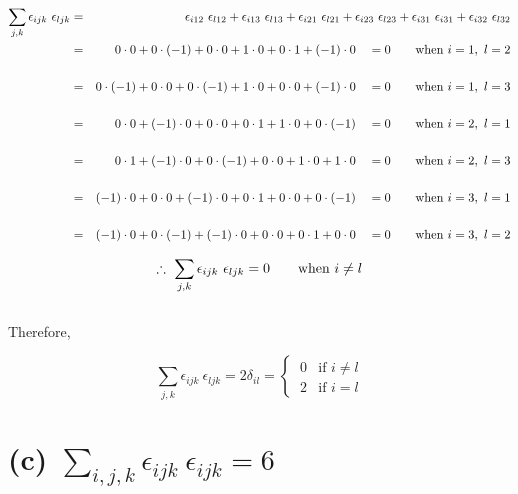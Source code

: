 \documentclass[a4paper]{article}
\begin{document}
\begin{eqnarray*}
	\sum_{j,k} \epsilon_{ijk} \ \epsilon_{ljk} & = & \epsilon_{i12} \ \epsilon_{l12} + \epsilon_{i13} \ \epsilon_{l13} + \epsilon_{i21} \ \epsilon_{l21} + \epsilon_{i23} \ \epsilon_{l23} + \epsilon_{i31} \ \epsilon_{i31} + \epsilon_{i32} \ \epsilon_{l32}\\
	& = & 0\cdot0 + 0\cdot(-1) + 0\cdot0 + 1\cdot0 + 0\cdot1 + (-1)\cdot0 \quad = 0 \text{\qquad when $i=1,\ l=2$} \\\\
	& = & 0\cdot(-1) + 0\cdot0 + 0\cdot(-1) + 1\cdot0 + 0\cdot0 + (-1)\cdot0 \quad = 0 \text{\qquad when $i=1, \ l=3$} \\\\
	& = & 0\cdot0 + (-1)\cdot0 + 0\cdot0 + 0\cdot1 + 1\cdot0 + 0\cdot(-1) \quad = 0 \text{\qquad when $i=2,\ l=1$} \\\\
	& = & 0\cdot1 + (-1)\cdot0 + 0\cdot(-1) + 0\cdot0 + 1\cdot0 + 1\cdot0 \quad = 0 \text{\qquad when $i=2,\ l=3$} \\\\
	& = & (-1)\cdot0 + 0\cdot0 + (-1)\cdot0 + 0\cdot1 + 0\cdot0 + 0\cdot(-1) \quad = 0 \text{\qquad when $i=3,\ l=1$} \\\\
	& = & (-1)\cdot0 + 0\cdot(-1) + (-1)\cdot0 + 0\cdot0 + 0\cdot1 + 0\cdot0 \quad = 0 \text{\qquad when $i=3,\ l=2$}
\end{eqnarray*}

\begin{equation*}
	\therefore \ \sum_{j,k} \epsilon_{ijk} \ \epsilon_{ljk} = 0 \text{\qquad when $i \neq l$}
\end{equation*}
\\

Therefore,

\begin{equation*}
	\sum_{j,k} \epsilon_{ijk} \ \epsilon_{ljk} = 2 \delta_{il} = 
	\begin{cases}
	  	\ 0 & \text{if } i \neq l \\
	    \ 2 & \text{if } i = l
	  \end{cases}
\end{equation*}


\section*{(c) $ {\sum\limits_{i,j,k}} \epsilon_{ijk} \ \epsilon_{ijk} = 6$}
\end{document}
